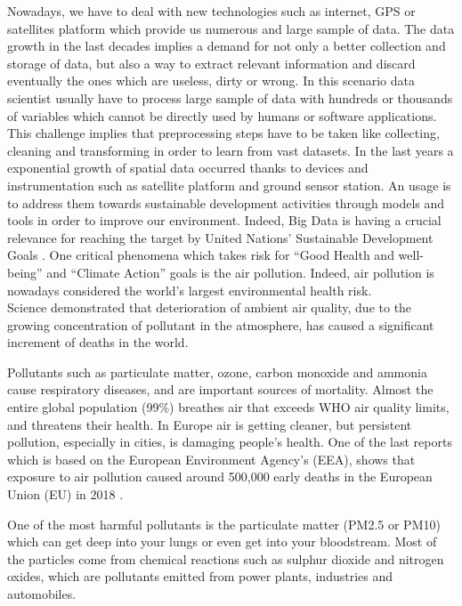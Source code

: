 Nowadays, we have to deal with new technologies such as internet, GPS or satellites platform which provide us numerous and large sample of data. The data growth in the last decades implies a demand for not only a better collection and storage of data, but also a way to extract relevant information and discard eventually the ones which are useless, dirty or wrong.
In this scenario data scientist usually have to process large sample of data with hundreds or thousands of variables which \cite{garcia2016big} cannot be directly used by humans or software applications.
This challenge implies that preprocessing steps have to be taken like collecting, cleaning and transforming  in order to learn from vast datasets.
In the last years a exponential growth of spatial data occurred thanks to devices and instrumentation such as satellite platform and ground sensor station. 
An usage is to address them towards sustainable development activities through models and tools in order to improve our environment. Indeed, Big Data is having a crucial relevance for reaching the target by United Nations’ Sustainable Development Goals \cite{zhang2019orchestrating}.
One critical phenomena which takes risk for “Good Health and well-being” and “Climate Action” goals is the air pollution.
Indeed, air pollution is nowadays considered the world's largest environmental health risk.\\
Science demonstrated that deterioration of ambient air quality, due to the growing concentration of pollutant in the atmosphere, has caused a significant increment of deaths in the world.\par  
Pollutants such as particulate matter, ozone, carbon monoxide and ammonia cause respiratory diseases, and are important sources of mortality.
Almost the entire global population (99\%) breathes air that exceeds WHO air quality limits, and threatens their health.\newline
In Europe air is getting cleaner, but persistent pollution, especially in cities, is damaging people’s health. One of the last reports which is based on the European Environment Agency’s (EEA), shows that exposure to air pollution caused around 500,000 early deaths in the European Union (EU) in 2018 \cite{european2018air}.\par
One of the most harmful pollutants is the particulate matter (PM2.5 or PM10) which can get deep into your lungs or even get into your bloodstream.\newline
Most of the particles come from chemical reactions such as sulphur dioxide and nitrogen oxides, which are pollutants emitted from power plants, industries and automobiles.\par
